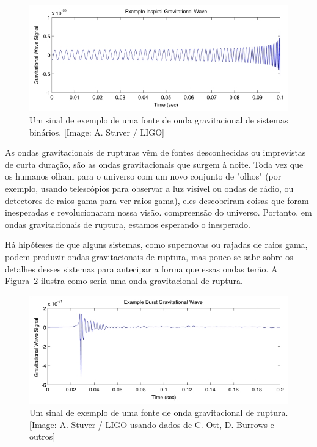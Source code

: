 \begin{figure}[ht]
\centering
\includegraphics[width=.9\textwidth]{figuras/inspiral_tn.jpg}
\caption{Um sinal de exemplo de uma fonte de onda gravitacional de sistemas binários. [Image: A. Stuver / LIGO]}
\label{figondainspiral}
\end{figure}

As ondas gravitacionais de rupturas vêm de fontes desconhecidas ou imprevistas de curta duração, são as ondas gravitacionais que surgem à noite. Toda vez que os humanos olham para o universo com um novo conjunto de "olhos" (por exemplo, usando telescópios para observar a luz visível ou ondas de rádio, ou detectores de raios gama para ver raios gama), eles descobriram coisas que foram inesperadas e revolucionaram nossa visão. compreensão do universo. Portanto, em ondas gravitacionais de ruptura, estamos esperando o inesperado. 

Há hipóteses de que alguns sistemas, como supernovas ou rajadas de raios gama, podem produzir ondas gravitacionais de ruptura, mas pouco se sabe sobre os detalhes desses sistemas para antecipar a forma que essas ondas terão. A Figura~\ref{figondaruptura} ilustra como seria uma onda gravitacional de ruptura. 

\begin{figure}[ht]
\centering
\includegraphics[width=.9\textwidth]{figuras/burst_tn.jpg}
\caption{Um sinal de exemplo de uma fonte de onda gravitacional de ruptura. [Image: A. Stuver / LIGO usando dados de C. Ott, D. Burrows e outros]}
\label{figondaruptura}
\end{figure}


